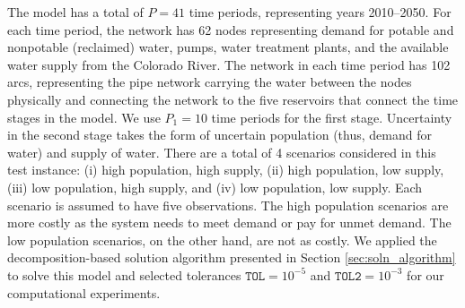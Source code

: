 \documentclass[11pt]{article}
\newcommand{\x}{\mathbf{x}}
\newcommand{\y}{\mathbf{y}}
\renewcommand{\c}{\mathbf{c}}
\newcommand{\q}{\mathbf{q}}
\renewcommand{\b}{\mathbf{b}}
\renewcommand{\d}{\mathbf{d}}
\begin{document}


The model has a total of $P = 41$ time periods, representing years 2010--2050. 
For each time period, the network has 62 nodes representing demand for potable and nonpotable (reclaimed) water, pumps, water treatment plants, and the available water supply from the Colorado River.
The network in each time period has 102 arcs, representing the pipe network carrying the water between the nodes physically and connecting the network to the five reservoirs that connect the time stages in the model.
We use $P_1 = 10$ time periods for the first stage.
Uncertainty in the second stage takes the form of uncertain population (thus, demand for water) and supply of water.
There are a total of 4 scenarios considered in this test instance: (i) high population, high supply, (ii) high population, low supply, (iii) low population, high supply, and (iv) low population, low supply.
Each scenario is assumed to have five observations.
The high population scenarios are more costly as the system needs to meet demand or pay for unmet demand.
The low population scenarios, on the other hand, are not as costly. 
We applied the decomposition-based solution algorithm presented in Section \ref{sec:soln_algorithm} to solve this model and selected tolerances $\texttt{TOL} = 10^{-5}$ and $\texttt{TOL2} = 10^{-3}$ for our computational experiments.
\end{document}
